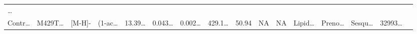 \documentclass[
]{article}
\begin{document}
\begin{longtable}[]{@{}llllllllllllllll@{}}
\begin{minipage}[t]{0.02\columnwidth}
\ldots{}\strut
\end{minipage}\tabularnewline
\begin{minipage}[t]{0.04\columnwidth}\raggedright
Contr\ldots{}\strut
\end{minipage} & \begin{minipage}[t]{0.04\columnwidth}\raggedright
M429T\ldots{}\strut
\end{minipage} & \begin{minipage}[t]{0.04\columnwidth}\raggedright
{[}M-H{]}-\strut
\end{minipage} & \begin{minipage}[t]{0.04\columnwidth}\raggedright
(1-ac\ldots{}\strut
\end{minipage} & \begin{minipage}[t]{0.04\columnwidth}\raggedright
13.39\ldots{}\strut
\end{minipage} & \begin{minipage}[t]{0.04\columnwidth}\raggedright
0.043\ldots{}\strut
\end{minipage} & \begin{minipage}[t]{0.04\columnwidth}\raggedright
0.002\ldots{}\strut
\end{minipage} & \begin{minipage}[t]{0.04\columnwidth}\raggedright
429.1\ldots{}\strut
\end{minipage} & \begin{minipage}[t]{0.04\columnwidth}\raggedright
50.94\strut
\end{minipage} & \begin{minipage}[t]{0.04\columnwidth}\raggedright
NA\strut
\end{minipage} & \begin{minipage}[t]{0.03\columnwidth}\raggedright
NA\strut
\end{minipage} & \begin{minipage}[t]{0.04\columnwidth}\raggedright
Lipid\ldots{}\strut
\end{minipage} & \begin{minipage}[t]{0.04\columnwidth}\raggedright
Preno\ldots{}\strut
\end{minipage} & \begin{minipage}[t]{0.04\columnwidth}\raggedright
Sesqu\ldots{}\strut
\end{minipage} & \begin{minipage}[t]{0.04\columnwidth}\raggedright
32993\ldots{}\strut
\end{minipage} & \begin{minipage}[t]{0.02\columnwidth}\raggedright

\end{minipage}
\end{longtable}
\end{document}
